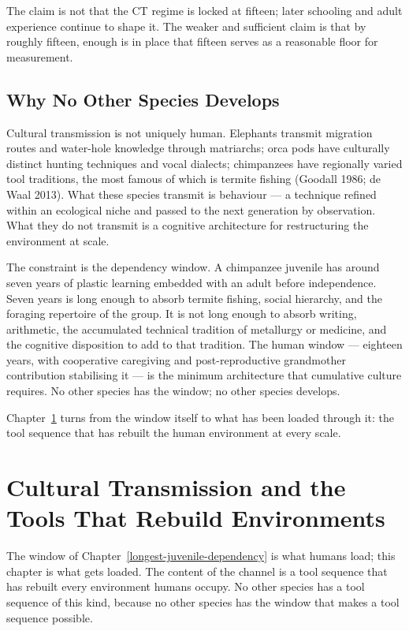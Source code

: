 \documentclass[12pt,letterpaper]{article}
\begin{document}
The claim is not that the CT regime is locked at fifteen; later
schooling and adult experience continue to shape it. The weaker and
sufficient claim is that by roughly fifteen, enough is in place that
fifteen serves as a reasonable floor for measurement.

\subsection{Why No Other Species Develops}\label{why-no-other-species-develops}

Cultural transmission is not uniquely human. Elephants transmit
migration routes and water-hole knowledge through matriarchs; orca
pods have culturally distinct hunting techniques and vocal dialects;
chimpanzees have regionally varied tool traditions, the most famous
of which is termite fishing (Goodall 1986; de Waal 2013). What these
species transmit is behaviour --- a technique refined within an
ecological niche and passed to the next generation by observation.
What they do not transmit is a cognitive architecture for restructuring
the environment at scale.

The constraint is the dependency window. A chimpanzee juvenile has
around seven years of plastic learning embedded with an adult before
independence. Seven years is long enough to absorb termite fishing,
social hierarchy, and the foraging repertoire of the group. It is not
long enough to absorb writing, arithmetic, the accumulated technical
tradition of metallurgy or medicine, and the cognitive disposition to
add to that tradition. The human window --- eighteen years, with
cooperative caregiving and post-reproductive grandmother contribution
stabilising it --- is the minimum architecture that cumulative culture
requires. No other species has the window; no other species develops.

Chapter~\ref{cultural-transmission} turns from the window itself to
what has been loaded through it: the tool sequence that has rebuilt
the human environment at every scale.

\section{Cultural Transmission and the Tools That Rebuild Environments}\label{cultural-transmission}

The window of Chapter~\ref{longest-juvenile-dependency} is what humans
load; this chapter is what gets loaded. The content of the channel
is a tool sequence that has rebuilt every environment humans occupy.
No other species has a tool sequence of this kind, because no other
species has the window that makes a tool sequence possible.
\end{document}
